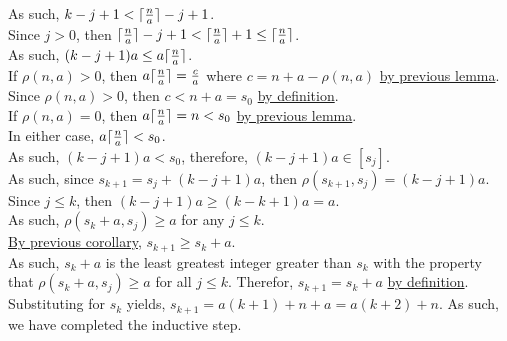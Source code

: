 \documentclass[a4paper,12pt]{article}
\DeclarePairedDelimiter{\ceil}{\lceil}{\rceil}
\begin{document}
\noindent As such, $k - j + 1 < \ceil{\frac{n}{a}} - j + 1$.\\

\noindent Since $j > 0$, then $\ceil{\frac{n}{a}} - j + 1 < \ceil{\frac{n}{a}} + 1 \leq \ceil{\frac{n}{a}}$.\\

\noindent As such, $(k - j + 1)a \leq a\ceil{\frac{n}{a}}$.\\

\noindent If $\rho(n, a) > 0$, then $a\ceil{\frac{n}{a}} = \frac{c}{a}$ where $c = n + a - \rho(n, a)$ \hyperlink{lemma:ceiling_function}{by previous lemma}.\\

\noindent Since $\rho(n, a) > 0$, then $c < n + a = s_0$ \hyperlink{definition:awkward_number_series}{by definition}.\\

\noindent If $\rho(n, a) = 0$, then $a\ceil{\frac{n}{a}} = n < s_0$ \hyperlink{lemma:ceiling_function}{by previous lemma}.\\

\noindent In either case, $a\ceil{\frac{n}{a}} < s_0$.\\

\noindent As such, $(k - j + 1)a < s_0$, therefore, $(k - j + 1)a \in [s_j]$.\\

\noindent As such, since $s_{k + 1} = s_j + (k - j + 1)a$, then $\rho(s_{k + 1}, s_j) = (k - j + 1)a$.\\

\noindent Since $j \leq k$, then $(k - j + 1)a \geq (k - k + 1)a = a$.\\

\noindent As such, $\rho(s_k + a, s_j) \geq a$ for any $j \leq k$.\\

\noindent \hyperlink{corollary:non_divisibility_of_elements}{By previous corollary}, $s_{k + 1} \geq s_k + a$.\\

\noindent As such, $s_k + a$ is the least greatest integer greater than $s_k$ with the property that $\rho(s_k + a, s_j) \geq a$ for all $j \leq k$. Therefor, $s_{k + 1} = s_k + a$ \hyperlink{definition:awkward_number_series}{by definition}.\\

\noindent Substituting for $s_k$ yields, $s_{k + 1} = a(k + 1) + n + a = a(k + 2) + n$. As such, we have completed the inductive step.
\end{document}
